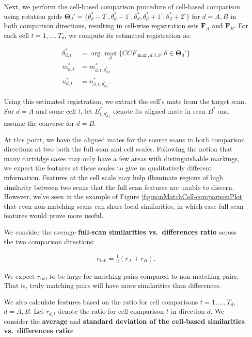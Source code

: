 \documentclass[11pt,]{isuthesis}
\begin{document}
Next, we perform the cell-based comparison procedure of cell-based comparison using rotation grids \(\pmb{\Theta}_d' = \{\theta_d^* - 2^{\circ}, \theta_d^* - 1^{\circ},\theta_d^*,\theta_d^* + 1^{\circ}, \theta_d^* + 2^{\circ}\}\) for \(d = A,B\) in both comparison directions, resulting in cell-wise registration sets \(\pmb{F}_A\) and \(\pmb{F}_B\).
For each cell \(t = 1,...,T_d\), we compute its estimated registration as:

\begin{align*}
\theta_{d,t}^* &= \arg \max_\theta \{CCF_{\max, d, t, \theta} : \theta \in \pmb{\Theta}_d' \} \\
m_{d,t}^* &= m_{d,t,\theta_{d,t}^*}^* \\
n_{d,t}^* &= n_{d,t,\theta_{d,t}^*}^*.
\end{align*}

Using this estimated registration, we extract the cell's mate from the target scan.
For \(d = A\) and some cell \(t\), let \(B_{t,\theta_{d,t}^*}^*\) denote its aligned mate in scan \(B^*\) and assume the converse for \(d = B\).

At this point, we have the aligned mates for the source scans in both comparison directions at two both the full scan and cell scales.
Following the notion that many cartridge cases may only have a few areas with distinguishable markings, we expect the features at these scales to give us qualitatively different information.
Features at the cell scale may help illuminate regions of high similarity between two scans that the full scan features are unable to discern.
However, we've seen in the example of Figure \ref{fig:nonMatchCell-comparisonPlot} that even non-matching scans can share local similarities, in which case full scan features would prove more useful.

We consider the average \textbf{full-scan similarities vs.~differences ratio} across the two comparison directions:

\begin{align*}
r_{\text{full}} = \frac{1}{2}(r_A + r_B).
\end{align*}

We expect \(r_{\text{full}}\) to be large for matching pairs compared to non-matching pairs.
That is, truly matching pairs will have more similarities than differences.

We also calculate features based on the ratio for cell comparisons \(t = 1,...,T_d\), \(d = A,B\).
Let \(r_{d,t}\) denote the ratio for cell comparison \(t\) in direction \(d\).
We consider the \textbf{average} and \textbf{standard deviation of the cell-based similarities vs.~differences ratio}:
\end{document}
